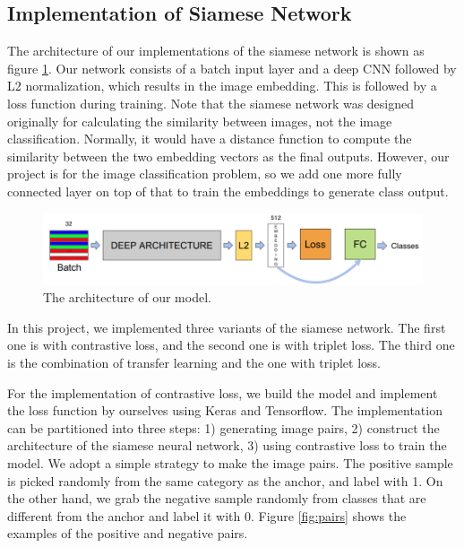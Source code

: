 \subsection{Implementation of Siamese Network}

The architecture of our implementations of the siamese network is shown as figure \ref{fig:model}. Our network consists of a batch input layer and a deep CNN followed by L2 normalization, which results in the image embedding. This is followed by a loss function during training. Note that the siamese network was designed originally for calculating the similarity between images, not the image classification. Normally, it would have a distance function to compute the similarity between the two embedding vectors as the final outputs. However, our project is for the image classification problem, so we add one more fully connected layer on top of that to train the embeddings to generate class output. 

\begin{figure}[h]
  \centering
  \includegraphics[width=\linewidth]{figs/model.png}
  \caption{The architecture of our model.}
  \label{fig:model}
\end{figure}

In this project, we implemented three variants of the siamese network. The first one is with contrastive loss, and the second one is with triplet loss. The third one is the combination of transfer learning and the one with triplet loss.

For the implementation of contrastive loss, we build the model and implement the loss function by ourselves using Keras and Tensorflow. The implementation can be partitioned into three steps: 1) generating image pairs, 2) construct the architecture of the siamese neural network, 3) using contrastive loss to train the model. We adopt a simple strategy to make the image pairs. The positive sample is picked randomly from the same category as the anchor, and label with 1. On the other hand, we grab the negative sample randomly from classes that are different from the anchor and label it with 0. Figure \ref{fig:pairs} shows the examples of the positive and negative pairs. 

